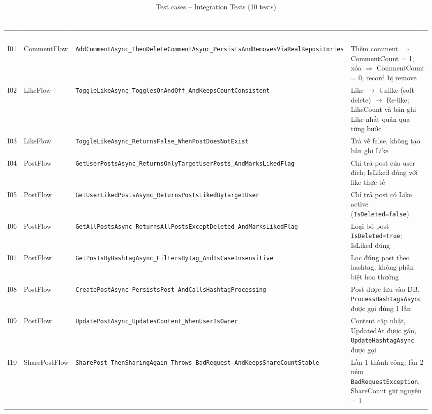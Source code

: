 \documentclass[a4paper]{article}
\begin{document}
\begin{longtable}{|C{0.7cm}|L{3.0cm}|L{4.2cm}|L{5.6cm}|}
\hline
{}
\textcolor{white}{\textbf{ID}} &
\textcolor{white}{\textbf{Test Class}} &
\textcolor{white}{\textbf{Test Method}} &
\textcolor{white}{\textbf{Kết quả mong đợi}} \\
\hline
\endfirsthead
\hline
{}
\textcolor{white}{\textbf{ID}} &
\textcolor{white}{\textbf{Test Class}} &
\textcolor{white}{\textbf{Test Method}} &
\textcolor{white}{\textbf{Kết quả mong đợi}} \\
\hline
\endhead
\hline
\endfoot

I01 & CommentFlow & \texttt{AddCommentAsync\_ThenDeleteCommentAsync\_PersistsAndRemovesViaRealRepositories} &
Thêm comment $\Rightarrow$ CommentCount = 1; xóa $\Rightarrow$ CommentCount = 0, record bị remove \\
\hline
I02 & LikeFlow & \texttt{ToggleLikeAsync\_TogglesOnAndOff\_AndKeepsCountConsistent} &
Like $\to$ Unlike (soft delete) $\to$ Re-like; LikeCount và bản ghi Like nhất quán qua từng bước \\
\hline
{}
I03 & LikeFlow & \texttt{ToggleLikeAsync\_ReturnsFalse\_WhenPostDoesNotExist} &
Trả về false, không tạo bản ghi Like \\
\hline
I04 & PostFlow & \texttt{GetUserPostsAsync\_ReturnsOnlyTargetUserPosts\_AndMarksLikedFlag} &
Chỉ trả post của user đích; IsLiked đúng với like thực tế \\
\hline
{}
I05 & PostFlow & \texttt{GetUserLikedPostsAsync\_ReturnsPostsLikedByTargetUser} &
Chỉ trả post có Like active (\texttt{IsDeleted=false}) \\
\hline
I06 & PostFlow & \texttt{GetAllPostsAsync\_ReturnsAllPostsExceptDeleted\_AndMarksLikedFlag} &
Loại bỏ post \texttt{IsDeleted=true}; IsLiked đúng \\
\hline
{}
I07 & PostFlow & \texttt{GetPostsByHashtagAsync\_FiltersByTag\_AndIsCaseInsensitive} &
Lọc đúng post theo hashtag, không phân biệt hoa thường \\
\hline
I08 & PostFlow & \texttt{CreatePostAsync\_PersistsPost\_AndCallsHashtagProcessing} &
Post được lưu vào DB, \texttt{ProcessHashtagsAsync} được gọi đúng 1 lần \\
\hline
{}
I09 & PostFlow & \texttt{UpdatePostAsync\_UpdatesContent\_WhenUserIsOwner} &
Content cập nhật, UpdatedAt được gán, \texttt{UpdateHashtagAsync} được gọi \\
\hline
I10 & SharePostFlow & \texttt{SharePost\_ThenSharingAgain\_Throws\_BadRequest\_AndKeepsShareCountStable} &
Lần 1 thành công; lần 2 ném \texttt{BadRequestException}, ShareCount giữ nguyên = 1 \\
\hline
\caption{Test cases -- Integration Tests (10 tests)}
\end{longtable}
\end{document}
